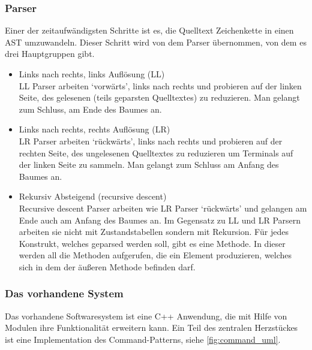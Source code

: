     \subsubsection{Parser}
    \label{sssec:Parser}
      Einer der zeitaufwändigsten Schritte ist es, die Quelltext Zeichenkette in einen AST umzuwandeln. Dieser Schritt wird von dem Parser übernommen, von dem es drei Hauptgruppen gibt.
      \begin{itemize}
        \item Links nach rechts, links Auflösung (LL) \autocite[S.77\,f.]{eirund2013formale}\\
          LL Parser arbeiten `vorwärts', links nach rechts und probieren auf der linken Seite, des gelesenen (teils geparsten Quelltextes) zu reduzieren. Man gelangt zum Schluss, am Ende des Baumes an.
        \item Links nach rechts, rechts Auflösung (LR) \autocite[S.77\,f.]{eirund2013formale}\\
          LR Parser arbeiten `rückwärts', links nach rechts und probieren auf der rechten Seite, des ungelesenen Quelltextes zu reduzieren um Terminals auf der linken Seite zu sammeln. Man gelangt zum Schluss am Anfang des Baumes an. \autocite{cs143-stanford}
        \item Rekursiv Absteigend (recursive descent)\\
          Recursive descent Parser arbeiten wie LR Parser `rückwärts' und gelangen am Ende auch am Anfang des Baumes an. Im Gegensatz zu LL und LR Parsern arbeiten sie nicht mit Zustandstabellen sondern mit Rekursion. Für jedes Konstrukt, welches geparsed werden soll, gibt es eine Methode. In dieser werden all die Methoden aufgerufen, die ein Element produzieren, welches sich in dem der äußeren Methode befinden darf.
      \end{itemize}

    \subsubsection{Das vorhandene System}
    \label{sssec:Das vorhandene System}
      Das vorhandene Softwaresystem ist eine C++ Anwendung, die mit Hilfe von Modulen ihre Funktionalität erweitern kann. Ein Teil des zentralen Herzstückes ist eine Implementation des Command-Patterns, siehe \autoref{fig:command_uml}.


